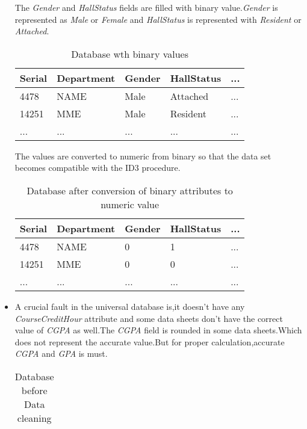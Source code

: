 \documentclass[a4paper,12pt]{book}
\begin{document}
\begin{itemize}
The \textit{Gender} and \textit{HallStatus} fields are filled with binary value.\textit{Gender} is represented as \textit{Male} or \textit{Female} and \textit{HallStatus} is represented with \textit{Resident} or \textit{Attached}.
\begin {table}[H]
\caption {Database wth binary values} \label{tab:title}
\begin{center}
\begin{tabular}{ | m{1cm} |  m{2cm} | m{2cm} | m{2cm} |  m{0.5cm} | } 
\hline
Serial & Department &  Gender & HallStatus & ... \\ 
\hline
4478 & NAME & Male & Attached & ... \\ 
\hline
14251 & MME & Male & Resident & ... \\ 
\hline
... & ... & ... & ... & ... \\ 
\hline
\end{tabular}
\end{center}
\end{table}
The values are converted to numeric  from binary so that the data set becomes compatible with the ID3 procedure.
\begin {table}[H]
\caption {Database after conversion of binary attributes to numeric value} \label{tab:title}
\begin{center}
\begin{tabular}{ | m{1cm} |  m{2cm} | m{2cm} | m{2cm} |  m{0.5cm} | } 
\hline
Serial & Department &  Gender & HallStatus & ... \\ 
\hline
4478 & NAME & 0 & 1 & ... \\ 
\hline
14251 & MME & 0 & 0 & ... \\ 
\hline
... & ... & ... & ... & ... \\ 
\hline
\end{tabular}
\end{center}
\end{table}
\item A crucial fault in the universal database is,it doesn't have any \textit{CourseCreditHour} attribute and some data sheets don't have the correct value of \textit{CGPA} as well.The \textit{CGPA} field is rounded in some data sheets.Which does not represent the accurate value.But for proper calculation,accurate \textit{CGPA} and \textit{GPA} is must.
\begin {table}[H]
\caption {Database before Data cleaning} \label{tab:title}
\begin{center}
\begin{tabular}{ | m{1cm} |  m{2cm} | m{2.1cm} | m{2cm} | m{2cm} | m{0.5cm} | } 

\end{tabular}
\end{center}
\end{table}
\end{itemize}
\end{document}
